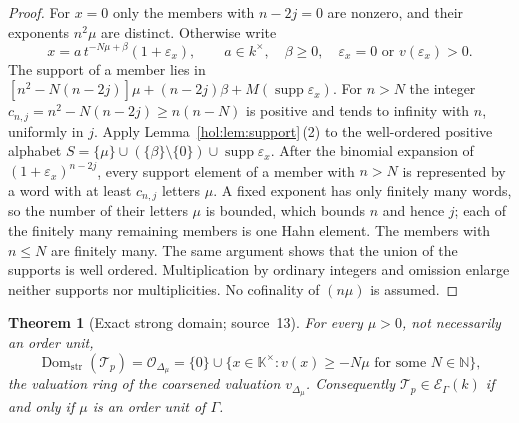\documentclass[11pt]{article}
\numberwithin{equation}{section}
\newtheorem{theorem}{Theorem}[section]
\theoremstyle{definition}
\theoremstyle{remark}
\newcommand{\N}{\mathbb N}
\newcommand{\supp}{\operatorname{supp}}
\newcommand{\Dom}{\operatorname{Dom}_{\mathrm{str}}}
\newcommand{\KK}{\mathbb K}
\newcommand{\EK}{\mathcal E_\Gamma(k)}
\begin{document}
\begin{proof}
For $x=0$ only the members with $n-2j=0$ are nonzero, and their exponents
$n^2\mu$ are distinct. Otherwise write
\[
 x=a\,t^{-N\mu+\beta}(1+\varepsilon_x),\qquad a\in k^\times,\quad\beta\ge0,
 \quad\varepsilon_x=0\text{ or }v(\varepsilon_x)>0.
\]
The support of a member lies in
$[n^2-N(n-2j)]\mu+(n-2j)\beta+M(\supp\varepsilon_x)$. For $n>N$ the integer
$c_{n,j}=n^2-N(n-2j)\ge n(n-N)$ is positive and tends to infinity with $n$,
uniformly in $j$. Apply Lemma~\ref{hol:lem:support}\,(2) to the well-ordered
positive alphabet
$S=\{\mu\}\cup(\{\beta\}\setminus\{0\})\cup\supp\varepsilon_x$. After the
binomial expansion of $(1+\varepsilon_x)^{n-2j}$, every support element of a
member with $n>N$ is represented by a word with at least $c_{n,j}$ letters
$\mu$. A fixed exponent has only finitely many words, so the number of their
letters $\mu$ is bounded, which bounds $n$ and hence $j$; each of the finitely
many remaining members is one Hahn element. The members with $n\le N$ are
finitely many. The same argument shows that the union of the supports is well
ordered. Multiplication by ordinary integers and omission enlarge neither
supports nor multiplicities. No cofinality of $(n\mu)$ is assumed.
\end{proof}

\begin{theorem}[Exact strong domain; source~13]\label{hol:td:thm:domain}
For every $\mu>0$, not necessarily an order unit,
\begin{equation}\label{hol:td:eq:domain}
 \Dom(\mathcal T_p)=\mathcal O_{\Delta_\mu}
 =\{0\}\cup\{x\in\KK^\times:v(x)\ge-N\mu\text{ for some }N\in\N\},
\end{equation}
the valuation ring of the coarsened valuation $v_{\Delta_\mu}$. Consequently
$\mathcal T_p\in\EK$ if and only if $\mu$ is an order unit of $\Gamma$.
\end{theorem}
\end{document}
